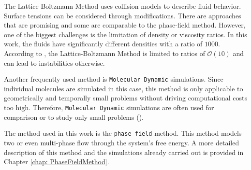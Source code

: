 The Lattice-Boltzmann Method uses collision models to describe fluid behavior. Surface tensions can be considered through modifications. There are approaches that are promising and some are comparable to the phase-field method. However, one of the biggest challenges is the limitation of density or viscosity ratios. In this work, the fluids have significantly different densities with a ratio of $1000$. According to \cite{chenCriticalReviewPseudopotential2014}, the Lattice-Boltzmann Method is limited to ratios of $\mathcal{O}(10)$ and can lead to instabilities otherwise.

Another frequently used method is \texttt{Molecular Dynamic} simulations. Since individual molecules are simulated in this case, this method is only applicable to geometrically and temporally small problems without driving computational costs too high. Therefore, \texttt{Molecular Dynamic} simulations are often used for comparison or to study only small problems (\cite{datta2023EarlyStageLiquidInfiltration,lacisNanoscaleShearedDroplet2022,martic2002MolecularDynamicsSimulation,dimitrov2007CapillaryRiseNanopores}).

The method used in this work is the \texttt{phase-field} method. This method models two or even multi-phase flow through the system's free energy. A more detailed description of this method and the simulations already carried out is provided in Chapter \ref{chap: PhaseFieldMethod}. 

